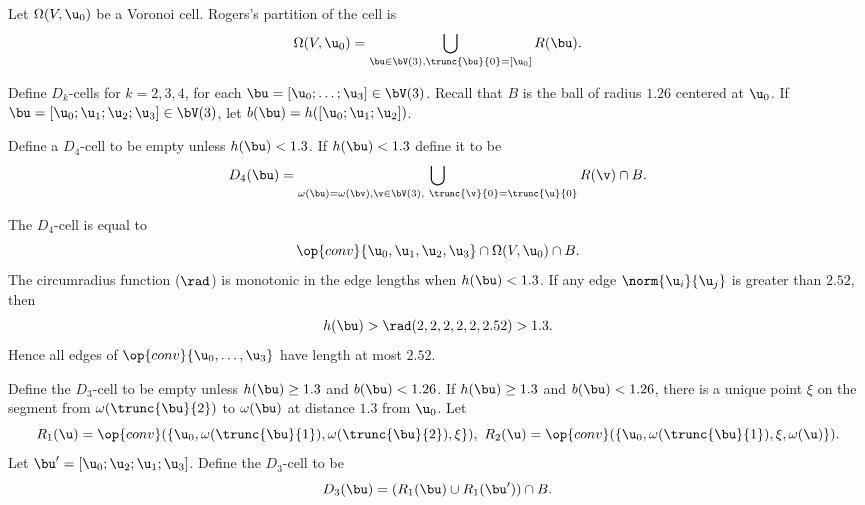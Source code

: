 Let $\Omega( V,\u_0)$ be a Voronoi cell.  Rogers's partition of the cell
is
\begin{displaymath}
\Omega(V, \u_0) = \bigcup_{ \bu\in  \bV(3), \trunc{\bu}{0}= [\u_0] } R( \bu).
\end{displaymath}
%
%


Define $D_k$-cells for $k=2,3,4$, for each $ \bu=[\u_0;\ldots;\u_3]\in \bV(3)$.
Recall that $B$ is the ball of radius $1.26$ centered at $ \u_0$.  If $\bu =[\u_0;\u_1;\u_2;\u_3]\in \bV(3)$, let
$b(\bu) = h([ \u_0; \u_1; \u_2])$.
%
%

\begin{definition}[$D_4$]
Define a $D_4$-cell to be empty unless $h(\bu)<1.3$.  If
$h(\bu)<1.3$ define it to be
\begin{displaymath}
D_4(\bu)=\bigcup_{\omega( \bu)=\omega(\bv),  \v\in  \bV(3),\ \trunc{\v}{0}= \trunc{\u}{0}}  R(\v)\cap B.
\end{displaymath}
%
\end{definition}

The $D_4$-cell is equal to
\begin{displaymath}
\op{conv}\{ \u_0, \u_1, \u_2, \u_3\} \cap \Omega(V, \u_0)\cap B.
\end{displaymath}
The circumradius function ($\rad$) is monotonic in the edge lengths when $h(\bu)<1.3$.  If
any edge $\norm{ \u_i}{ \u_j}$ is greater than $2.52$, then 
\begin{displaymath}
h(\bu) > \rad(2,2,2,2,2,2.52) > 1.3.
\end{displaymath}  
Hence all edges of $\op{conv}\{\u_0,\ldots,\u_3\}$ have
length at most $2.52$.

\begin{definition}[$D_3$]
Define the $D_3$-cell to be empty unless $h(\bu)\ge 1.3$ and
$b(\bu)< 1.26$.  If $h(\bu) \ge 1.3$ and $b(\bu)< 1.26$, there is a unique point $\xi$
on the segment from $\omega( \trunc{\bu}{2})$ to $\omega(\bu)$ at distance $1.3$ from $
\u_0$.  Let
\begin{displaymath}
R_1( \u) = \op{conv}(\{ \u_0,\omega( \trunc{\bu}{1}),\omega( \trunc{\bu}{2}),\xi\} ),\ 
R_2( \u) = \op{conv}(\{ \u_0,\omega( \trunc{\bu}{1}),\xi,\omega( \u)\} ).
\end{displaymath}
Let $ \bu' = [ \u_0; \u_2; \u_1; \u_3]$.
Define the $D_3$-cell to be
\begin{displaymath}
D_3(\bu) = (R_1( \bu) \cup R_1( \bu'))\cap B.
\end{displaymath}
\end{definition}

